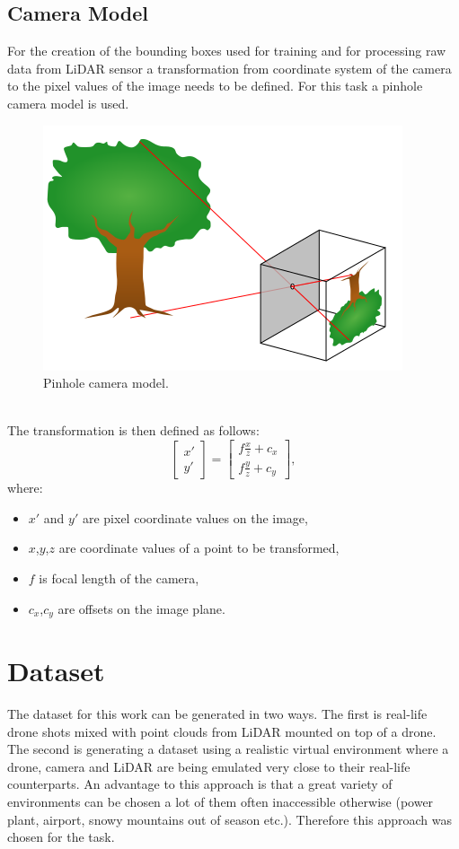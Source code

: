 \documentclass[twoside]{ctuthesis}
\theoremstyle{plain}
\theoremstyle{definition}
\theoremstyle{note}
\begin{document}
\section{Camera Model}
For the creation of the bounding boxes used for training and for processing raw data from LiDAR sensor a transformation from coordinate system of the camera to the pixel values of the image needs to be defined. For this task a pinhole camera model is used.
\begin{figure}[h]
	\centering
	\includegraphics[width=\textwidth]{pinhole.png}
	\caption{Pinhole camera model.}
\end{figure}\\
The transformation is then defined as follows:
\begin{equation} \label{eq:2}
	\begin{bmatrix}
		x'\\
		y'
	\end{bmatrix}=
	\begin{bmatrix}
		f\frac{x}{z}+c_x\\
		f\frac{y}{z}+c_y
	\end{bmatrix},
\end{equation}
where:
\begin{itemize}
	\item $x'$ and $y'$ are pixel coordinate values on the image,
	\item $x$,$y$,$z$ are coordinate values of a point to be transformed,
	\item $f$ is focal length of the camera,
	\item $c_x$,$c_y$ are offsets on the image plane.
\end{itemize}
\chapter{Dataset}
The dataset for this work can be generated in two ways. The first is real-life drone shots mixed with point clouds from LiDAR mounted on top of a drone. The second is generating a dataset using a realistic virtual environment where a drone, camera and LiDAR are being emulated very close to their real-life counterparts. An advantage to this approach is that a great variety of environments can be chosen a lot of them often inaccessible otherwise (power plant, airport, snowy mountains out of season etc.). Therefore this approach was chosen for the task.
\end{document}
